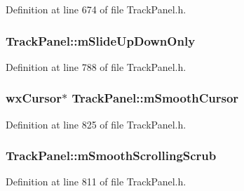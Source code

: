 Definition at line 674 of file Track\+Panel.\+h.

\subsubsection[{\texorpdfstring{m\+Slide\+Up\+Down\+Only}{mSlideUpDownOnly}}]{ Track\+Panel\+::m\+Slide\+Up\+Down\+Only\hspace{0.3cm}{\ttfamily [protected]}}\hypertarget{class_track_panel_a02afbbe38ff6d95074c04ec433a31262}{}\label{class_track_panel_a02afbbe38ff6d95074c04ec433a31262}


Definition at line 788 of file Track\+Panel.\+h.

\subsubsection[{\texorpdfstring{m\+Smooth\+Cursor}{mSmoothCursor}}]{\setlength{\rightskip}{0pt plus 5cm}wx\+Cursor$\ast$ Track\+Panel\+::m\+Smooth\+Cursor\hspace{0.3cm}{\ttfamily [protected]}}\hypertarget{class_track_panel_a30fd1afbc5cb7aeed61bffb0e5d472e2}{}\label{class_track_panel_a30fd1afbc5cb7aeed61bffb0e5d472e2}


Definition at line 825 of file Track\+Panel.\+h.

\subsubsection[{\texorpdfstring{m\+Smooth\+Scrolling\+Scrub}{mSmoothScrollingScrub}}]{ Track\+Panel\+::m\+Smooth\+Scrolling\+Scrub\hspace{0.3cm}{\ttfamily [protected]}}\hypertarget{class_track_panel_ae17e115fd911a87f495222351dbdb22e}{}\label{class_track_panel_ae17e115fd911a87f495222351dbdb22e}


Definition at line 811 of file Track\+Panel.\+h.

